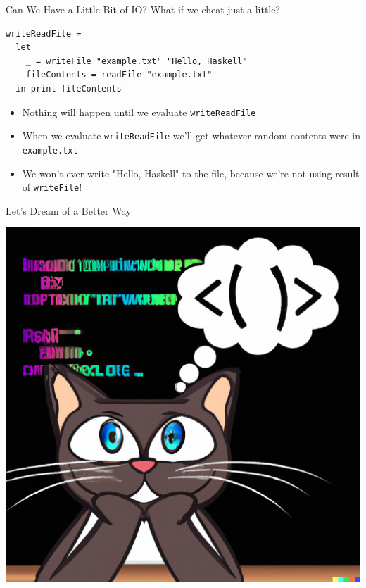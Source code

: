 \documentclass[10pt, presentation, colorlinks]{beamer}
\begin{document}
\begin{frame}[label={sec:org6280334},fragile]{Can We Have a Little Bit of IO?}
 What if we cheat just a little?

\bigskip
\pause

\begin{verbatim}
writeReadFile =
  let
    _ = writeFile "example.txt" "Hello, Haskell"
    fileContents = readFile "example.txt"
  in print fileContents
\end{verbatim}

\bigskip

\pause
\begin{itemize}
\item Nothing will happen until we evaluate \texttt{writeReadFile}
\end{itemize}
\pause
\begin{itemize}
\item When we evaluate \texttt{writeReadFile} we'll get whatever random contents were in \texttt{example.txt}
\end{itemize}
\pause
\begin{itemize}
\item We won't ever write \alert{"Hello, Haskell"} to the file, because we're not using result of \texttt{writeFile}!
\end{itemize}
\end{frame}

\begin{frame}[label={sec:org1393aaa}]{Let's Dream of a Better Way}
\begin{center}
\includegraphics[height=0.6\textheight]{./img/dreaming.png}
\end{center}
\end{frame}
\end{document}
